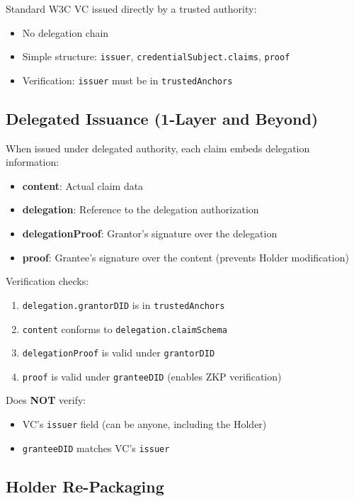 Standard W3C VC issued directly by a trusted authority:

\begin{itemize}
  \item No delegation chain
  \item Simple structure: \texttt{issuer}, \texttt{credentialSubject.claims}, \texttt{proof}
  \item Verification: \texttt{issuer} must be in \texttt{trustedAnchors}
\end{itemize}

\subsection{Delegated Issuance (1-Layer and Beyond)}

When issued under delegated authority, each claim embeds delegation information:

\begin{itemize}
  \item \textbf{content}: Actual claim data
  \item \textbf{delegation}: Reference to the delegation authorization
  \item \textbf{delegationProof}: Grantor's signature over the delegation
  \item \textbf{proof}: Grantee's signature over the content (prevents Holder modification)
\end{itemize}

Verification checks:
\begin{enumerate}
  \item \texttt{delegation.grantorDID} is in \texttt{trustedAnchors}
  \item \texttt{content} conforms to \texttt{delegation.claimSchema}
  \item \texttt{delegationProof} is valid under \texttt{grantorDID}
  \item \texttt{proof} is valid under \texttt{granteeDID} (enables ZKP verification)
\end{enumerate}

Does \textbf{NOT} verify:
\begin{itemize}
  \item VC's \texttt{issuer} field (can be anyone, including the Holder)
  \item \texttt{granteeDID} matches VC's \texttt{issuer}
\end{itemize}

\subsection{Holder Re-Packaging}

